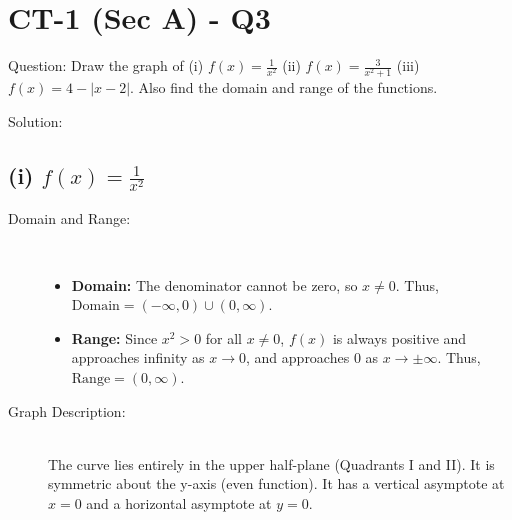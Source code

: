 \documentclass[11pt, a4paper]{article}
\begin{document}


\section*{CT-1 (Sec A) - Q3}

Question:
Draw the graph of (i) $f(x) = \frac{1}{x^2}$ (ii) $f(x) = \frac{3}{x^2+1}$ (iii) $f(x) = 4 - |x - 2|$. Also find the domain and range of the functions.

Solution:

\subsection*{(i) $f(x) = \frac{1}{x^2}$}
\begin{description}
    \item[Domain and Range:] \ 
    \begin{itemize}
        \item \textbf{Domain:} The denominator cannot be zero, so $x \neq 0$. Thus, $\text{Domain} = (-\infty, 0) \cup (0, \infty)$.
        \item \textbf{Range:} Since $x^2 > 0$ for all $x \neq 0$, $f(x)$ is always positive and approaches infinity as $x \to 0$, and approaches $0$ as $x \to \pm\infty$. Thus, $\text{Range} = (0, \infty)$.
    \end{itemize}
    \item[Graph Description:] \ \\
    The curve lies entirely in the upper half-plane (Quadrants I and II). It is symmetric about the y-axis (even function). It has a vertical asymptote at $x = 0$ and a horizontal asymptote at $y = 0$.
\end{description}
\end{document}
